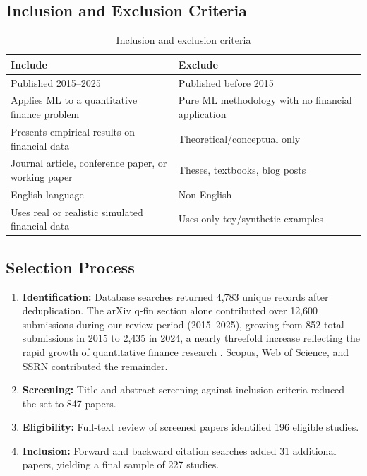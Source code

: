\subsection{Inclusion and Exclusion Criteria}

\begin{table}[H]
\centering
\caption{Inclusion and exclusion criteria}
\label{tab:criteria}
\begin{tabularx}{\textwidth}{lX}
\toprule
\textbf{Include} & \textbf{Exclude} \\
\midrule
Published 2015--2025 & Published before 2015 \\
Applies ML to a quantitative finance problem & Pure ML methodology with no financial application \\
Presents empirical results on financial data & Theoretical/conceptual only \\
Journal article, conference paper, or working paper & Theses, textbooks, blog posts \\
English language & Non-English \\
Uses real or realistic simulated financial data & Uses only toy/synthetic examples \\
\bottomrule
\end{tabularx}
\end{table}

\subsection{Selection Process}

\begin{enumerate}[leftmargin=*]
    \item \textbf{Identification:} Database searches returned 4,783 unique records after deduplication. The arXiv q-fin section alone contributed over 12,600 submissions during our review period (2015--2025), growing from 852 total submissions in 2015 to 2,435 in 2024, a nearly threefold increase reflecting the rapid growth of quantitative finance research \citep{arXivStats2025}. Scopus, Web of Science, and SSRN contributed the remainder.
    \item \textbf{Screening:} Title and abstract screening against inclusion criteria reduced the set to 847 papers.
    \item \textbf{Eligibility:} Full-text review of screened papers identified 196 eligible studies.
    \item \textbf{Inclusion:} Forward and backward citation searches added 31 additional papers, yielding a final sample of 227 studies.
\end{enumerate}


